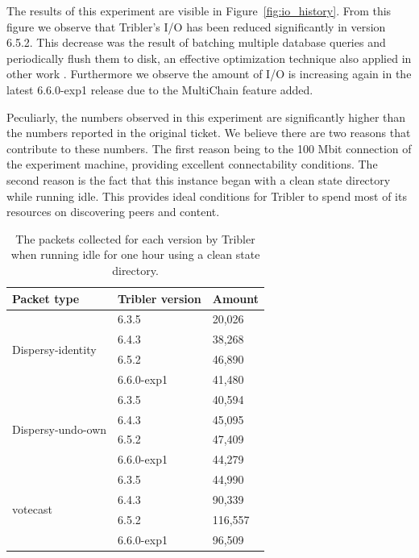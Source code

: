 The results of this experiment are visible in Figure~\ref{fig:io_history}.
From this figure we observe that Tribler's I/O has been reduced significantly in version 6.5.2.
This decrease was the result of batching multiple database queries and periodically flush them to disk, an effective optimization technique also applied in other work \cite{ouyang2011beyond, lin2009database}. 
Furthermore we observe the amount of I/O is increasing again in the latest 6.6.0-exp1 release due to the MultiChain feature added. 

Peculiarly, the numbers observed in this experiment are significantly higher than the numbers reported in the original ticket.
We believe there are two reasons that contribute to these numbers.
The first reason being to the 100 Mbit connection of the experiment machine, providing excellent connectability conditions. 
The second reason is the fact that this instance began with a clean state directory while running idle.
This provides ideal conditions for Tribler to spend most of its resources on discovering peers and content.

\begin{table}[]
	\centering
	\caption{The packets collected for each version by Tribler when running idle for one hour using a clean state directory.}
	\label{table:packets_collected_idle}
	\begin{tabular}{|l|l|l|}
		\hline
		\textbf{Packet type}                         & \textbf{Tribler version} & \textbf{Amount}  \\ \hline
		\multirow{4}{*}{Dispersy-identity} & 6.3.5           & 20,026  \\ \cline{2-3} 
		& 6.4.3           & 38,268  \\ \cline{2-3} 
		& 6.5.2           & 46,890  \\ \cline{2-3} 
		& 6.6.0-exp1      & 41,480  \\ \hline
		\multirow{4}{*}{Dispersy-undo-own} & 6.3.5           & 40,594  \\ \cline{2-3} 
		& 6.4.3           & 45,095  \\ \cline{2-3} 
		& 6.5.2           & 47,409  \\ \cline{2-3} 
		& 6.6.0-exp1      & 44,279  \\ \hline
		\multirow{4}{*}{votecast}          & 6.3.5           & 44,990  \\ \cline{2-3} 
		& 6.4.3           & 90,339  \\ \cline{2-3} 
		& 6.5.2           & 116,557 \\ \cline{2-3} 
		& 6.6.0-exp1      & 96,509  \\ \hline
	\end{tabular}
\end{table}

